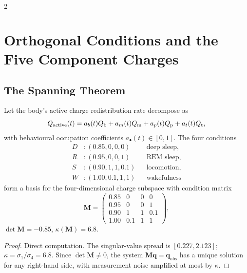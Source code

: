 \begin{multicols}{2}

\section{Orthogonal Conditions and the Five Component Charges}
\label{sec:ch08-orthogonal}

\subsection{The Spanning Theorem}

\begin{theorem}
\label{thm:ch08-orthogonal}
Let the body's active charge redistribution rate decompose as
\begin{equation}
Q_{\mathrm{active}}(t) = a_b(t)Q_{\mathrm{b}} + a_m(t)Q_{\mathrm{m}} + a_p(t)Q_{\mathrm{p}} + a_t(t)Q_{\mathrm{t}},
\end{equation}
with behavioural occupation coefficients $a_\bullet(t) \in [0,1]$. The four conditions
\begin{align*}
D &: (0.85, 0, 0, 0) && \text{deep sleep},\\
R &: (0.95, 0, 0, 1) && \text{REM sleep},\\
S &: (0.90, 1, 1, 0.1) && \text{locomotion},\\
W &: (1.00, 0.1, 1, 1) && \text{wakefulness}
\end{align*}
form a basis for the four-dimensional charge subspace with condition matrix
\begin{equation}
\mathbf{M} =
\begin{pmatrix}
0.85 & 0 & 0 & 0\\
0.95 & 0 & 0 & 1\\
0.90 & 1 & 1 & 0.1\\
1.00 & 0.1 & 1 & 1
\end{pmatrix},
\label{eq:ch08-M}
\end{equation}
$\det\mathbf{M} = -0.85$, $\kappa(\mathbf{M}) = 6.8$.
\end{theorem}

\begin{proof}
Direct computation. The singular-value spread is $[0.227, 2.123]$; $\kappa = \sigma_1/\sigma_4 = 6.8$. Since $\det\mathbf{M} \neq 0$, the system $\mathbf{M}\mathbf{q} = \mathbf{q}_{\mathrm{obs}}$ has a unique solution for any right-hand side, with measurement noise amplified at most by $\kappa$.
\end{proof}


\end{multicols}
